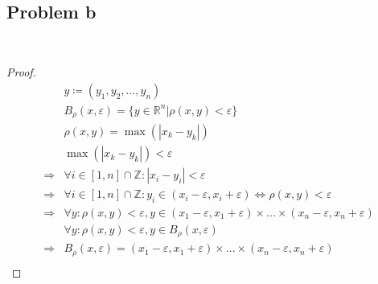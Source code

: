 \documentclass{article}
\begin{document}
~

\subsection*{Problem b}

~

\begin{proof}
    \begin{align*}
        &y\coloneqq (y_1,y_2,...,y_n)\\
        &B_\rho(x,\varepsilon )=\{y\in \mathbb{R} ^n|\rho(x,y)<\varepsilon\}\\
        &\rho(x,y)=\max(|x_k-y_k|)\\
        &\max(|x_k-y_k|)<\varepsilon\\
        \Rightarrow&\forall i\in[1,n]\cap \mathbb{Z}:|x_i-y_i|<\varepsilon\\
        \Rightarrow&\forall i\in[1,n]\cap \mathbb{Z}:y_i\in(x_i-\varepsilon,x_i+\varepsilon)\Leftrightarrow \rho(x,y)<\varepsilon\\
        \Rightarrow&\forall y:\rho(x,y)<\varepsilon,y\in (x_1-\varepsilon,x_1+\varepsilon)\times ...\times (x_n-\varepsilon,x_n+\varepsilon)\\
        &\forall y:\rho(x,y)<\varepsilon,y\in B_\rho(x,\varepsilon)\\
        \Rightarrow&B_\rho(x,\varepsilon)=(x_1-\varepsilon,x_1+\varepsilon)\times ...\times (x_n-\varepsilon,x_n+\varepsilon)\\
    \end{align*}
\end{proof}    
\end{document}
